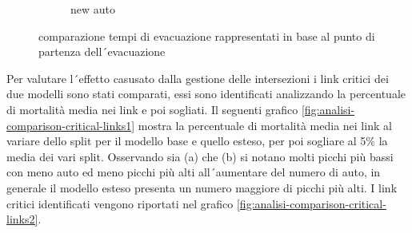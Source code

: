 \begin{figure}
\begin{subfigure}{0.475\textwidth}
        \caption{new auto}
    \end{subfigure}
    \caption{comparazione tempi di evacuazione rappresentati in base al punto di partenza dell´evacuazione}
    \label{fig:analisi-comparison-ev-times-map}
\end{figure}

Per valutare l´effetto casusato dalla gestione delle intersezioni i link critici dei due modelli sono stati comparati,
essi sono identificati analizzando la percentuale di mortalità media nei link e poi sogliati.
Il seguenti grafico \ref{fig:analisi-comparison-critical-links1} mostra la percentuale di mortalità
media nei link al variare dello split per il modello base e quello esteso, per poi sogliare al 5\%
la media dei vari split.
Osservando sia (a) che (b) si notano molti picchi più bassi con meno auto ed meno picchi più alti
all´aumentare del numero di auto, in generale il modello esteso presenta un numero maggiore di picchi più alti. 
I link critici identificati vengono riportati nel grafico \ref*{fig:analisi-comparison-critical-links2}.

